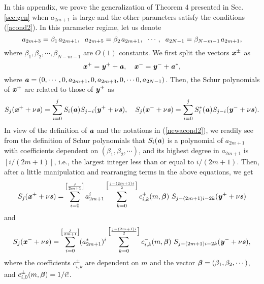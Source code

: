\documentclass[amsmath,amssymb]{revtex4}
\def\[{\begin{equation}}
\def\]{\end{equation}}
\begin{document}
In this appendix, we prove the generalization of Theorem 4 presented in Sec. \ref{sec:gen} when $a_{2m+1}$ is large and the other parameters satisfy the conditions (\ref{acond2}). In this parameter regime, let us denote
\[ \label{newacond2}
a_{2m+3}=\beta_{1} \hspace{0.04cm} a_{2m+1}, \hspace{0.2cm} a_{2m+5}=\beta_{2} \hspace{0.04cm} a_{2m+1}, \hspace{0.2cm} \cdots, \hspace{0.2cm} a_{2N-1}=\beta_{N-m-1} \hspace{0.04cm} a_{2m+1},
\]
where $\beta_{1}, \beta_{2}, \cdots, \beta_{N-m-1}$ are $O(1)$ constants. We first split the vectors  $\textbf{\emph{x}}^{\pm}$ as
\[
\textbf{\emph{x}}^{+}=\textbf{\emph{y}}^{+}+\textbf{\emph{a}}, \quad
\textbf{\emph{x}}^{-}=\textbf{\emph{y}}^{-}+\textbf{\emph{a}}^*,
\]
where $\textbf{\emph{a}}=(0, \cdots, 0, a_{2m+1}, 0,  a_{2m+3}, 0, \cdots  0, a_{2N-1})$. Then, the Schur polynomials of $\textbf{\emph{x}}^{\pm}$ are related to those of $\textbf{\emph{y}}^{\pm}$ as
\begin{equation} \label{Sjrelation2}
S_{j}(\textbf{\emph{x}}^{+}+\nu\textbf{\emph{s}}) = \sum_{i=0}^{j} S_{i}(\textbf{\emph{a}})  S_{j-i}(\textbf{\emph{y}}^{+}+\nu\textbf{\emph{s}}), \quad
S_{j}(\textbf{\emph{x}}^{-}+\nu\textbf{\emph{s}}) = \sum_{i=0}^{j} S_{i}^*(\textbf{\emph{a}}) S_{j-i}(\textbf{\emph{y}}^{-}+\nu\textbf{\emph{s}}).
\end{equation}
In view of the definition of $\textbf{\emph{a}}$ and the notations in (\ref{newacond2}), we readily see from the definition of Schur polynomials that $S_{i}(\textbf{\emph{a}})$ is a polynomial of $a_{2m+1}$ with coefficients dependent on $(\beta_1, \beta_2, \cdots)$, and its highest degree in $a_{2m+1}$ is $[i/(2m+1)]$, i.e., the largest integer less than or equal to $i/(2m+1)$. Then, after a little manipulation and rearranging terms in the above equations, we get
\[ \label{AppSj1}
S_{j}(\textbf{\emph{x}}^{+}+\nu\textbf{\emph{s}}) = \sum_{i=0}^{\left[\frac{j}{2m+1}\right]}  a_{2m+1}^i
\sum_{k=0}^{\left[\frac{j-(2m+1)i}{2}\right]} c_{i,k}^+(m, \mbox{\boldmath$\beta$})\  S_{j-(2m+1)i-2k}(\textbf{\emph{y}}^{+}+\nu\textbf{\emph{s}})
\]
and
\[ \label{AppSj2}
S_{j}(\textbf{\emph{x}}^{-}+\nu\textbf{\emph{s}}) = \sum_{i=0}^{\left[\frac{j}{2m+1}\right]}  (a_{2m+1}^*)^i
\sum_{k=0}^{\left[\frac{j-(2m+1)i}{2}\right]} c_{i,k}^{-}(m, \mbox{\boldmath$\beta$})\  S_{j-(2m+1)i-2k}(\textbf{\emph{y}}^{-}+\nu\textbf{\emph{s}}),
\]
where the coefficients $c_{i,k}^\pm$ are dependent on $m$ and the vector $\mbox{\boldmath$\beta$}=(\beta_1, \beta_2, \cdots)$, and $c_{i,0}^\pm(m,\mbox{\boldmath$\beta$})=1/i!$.
\end{document}
